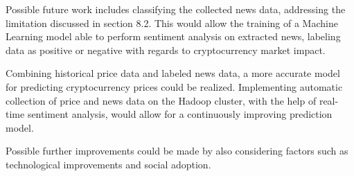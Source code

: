 Possible future work includes classifying the collected news data, addressing the limitation discussed in section 8.2. This would allow the training of a Machine Learning model able to perform sentiment analysis on extracted news, labeling data as positive or negative with regards to cryptocurrency market impact.

Combining historical price data and labeled news data, a more accurate model for predicting cryptocurrency prices could be realized. Implementing automatic collection of price and news data on the Hadoop cluster, with the help of real-time sentiment analysis, would allow for a continuously improving prediction model.

Possible further improvements could be made by also considering factors such as technological improvements and social adoption.
